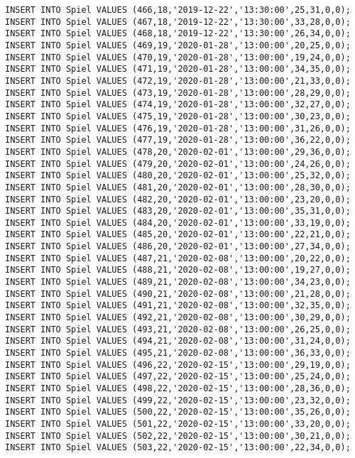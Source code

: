 \documentclass{bschlangaul-aufgabe}
\begin{document}
\begin{verbatim}
INSERT INTO Spiel VALUES (466,18,'2019-12-22','13:30:00',25,31,0,0);
INSERT INTO Spiel VALUES (467,18,'2019-12-22','13:30:00',33,28,0,0);
INSERT INTO Spiel VALUES (468,18,'2019-12-22','13:30:00',26,34,0,0);
INSERT INTO Spiel VALUES (469,19,'2020-01-28','13:00:00',20,25,0,0);
INSERT INTO Spiel VALUES (470,19,'2020-01-28','13:00:00',19,24,0,0);
INSERT INTO Spiel VALUES (471,19,'2020-01-28','13:00:00',34,35,0,0);
INSERT INTO Spiel VALUES (472,19,'2020-01-28','13:00:00',21,33,0,0);
INSERT INTO Spiel VALUES (473,19,'2020-01-28','13:00:00',28,29,0,0);
INSERT INTO Spiel VALUES (474,19,'2020-01-28','13:00:00',32,27,0,0);
INSERT INTO Spiel VALUES (475,19,'2020-01-28','13:00:00',30,23,0,0);
INSERT INTO Spiel VALUES (476,19,'2020-01-28','13:00:00',31,26,0,0);
INSERT INTO Spiel VALUES (477,19,'2020-01-28','13:00:00',36,22,0,0);
INSERT INTO Spiel VALUES (478,20,'2020-02-01','13:00:00',29,36,0,0);
INSERT INTO Spiel VALUES (479,20,'2020-02-01','13:00:00',24,26,0,0);
INSERT INTO Spiel VALUES (480,20,'2020-02-01','13:00:00',25,32,0,0);
INSERT INTO Spiel VALUES (481,20,'2020-02-01','13:00:00',28,30,0,0);
INSERT INTO Spiel VALUES (482,20,'2020-02-01','13:00:00',23,20,0,0);
INSERT INTO Spiel VALUES (483,20,'2020-02-01','13:00:00',35,31,0,0);
INSERT INTO Spiel VALUES (484,20,'2020-02-01','13:00:00',33,19,0,0);
INSERT INTO Spiel VALUES (485,20,'2020-02-01','13:00:00',22,21,0,0);
INSERT INTO Spiel VALUES (486,20,'2020-02-01','13:00:00',27,34,0,0);
INSERT INTO Spiel VALUES (487,21,'2020-02-08','13:00:00',20,22,0,0);
INSERT INTO Spiel VALUES (488,21,'2020-02-08','13:00:00',19,27,0,0);
INSERT INTO Spiel VALUES (489,21,'2020-02-08','13:00:00',34,23,0,0);
INSERT INTO Spiel VALUES (490,21,'2020-02-08','13:00:00',21,28,0,0);
INSERT INTO Spiel VALUES (491,21,'2020-02-08','13:00:00',32,35,0,0);
INSERT INTO Spiel VALUES (492,21,'2020-02-08','13:00:00',30,29,0,0);
INSERT INTO Spiel VALUES (493,21,'2020-02-08','13:00:00',26,25,0,0);
INSERT INTO Spiel VALUES (494,21,'2020-02-08','13:00:00',31,24,0,0);
INSERT INTO Spiel VALUES (495,21,'2020-02-08','13:00:00',36,33,0,0);
INSERT INTO Spiel VALUES (496,22,'2020-02-15','13:00:00',29,19,0,0);
INSERT INTO Spiel VALUES (497,22,'2020-02-15','13:00:00',25,24,0,0);
INSERT INTO Spiel VALUES (498,22,'2020-02-15','13:00:00',28,36,0,0);
INSERT INTO Spiel VALUES (499,22,'2020-02-15','13:00:00',23,32,0,0);
INSERT INTO Spiel VALUES (500,22,'2020-02-15','13:00:00',35,26,0,0);
INSERT INTO Spiel VALUES (501,22,'2020-02-15','13:00:00',33,20,0,0);
INSERT INTO Spiel VALUES (502,22,'2020-02-15','13:00:00',30,21,0,0);
INSERT INTO Spiel VALUES (503,22,'2020-02-15','13:00:00',22,34,0,0);

\end{verbatim}
\end{document}
